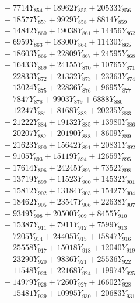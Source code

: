 \documentclass[a4paper,10pt]{article}
\begin{document}
{\begin{align}
&\;  + 7714 Y_{854} + 18962 Y_{855} + 20533 Y_{856} \\[0.3ex]
&\;  + 18577 Y_{857} + 9929 Y_{858} + 8814 Y_{859} \\[0.3ex]
&\;  + 14842 Y_{860} + 19038 Y_{861} + 14456 Y_{862} \\[0.3ex]
&\;  + 6959 Y_{863} + 18300 Y_{864} + 11430 Y_{865} \\[0.3ex]
&\;  + 18603 Y_{866} + 22809 Y_{867} + 24595 Y_{868} \\[0.5ex]\allowbreak
&\;  + 16433 Y_{869} + 24155 Y_{870} + 10765 Y_{871} \\[0.3ex]
&\;  + 22833 Y_{872} + 21332 Y_{873} + 23363 Y_{874} \\[0.3ex]
&\;  + 13024 Y_{875} + 22836 Y_{876} + 9695 Y_{877} \\[0.3ex]
&\;  + 7847 Y_{878} + 9903 Y_{879} + 6888 Y_{880} \\[0.3ex]
&\;  + 12247 Y_{881} + 8168 Y_{882} + 20235 Y_{883} \\[0.3ex]
&\;  + 21222 Y_{884} + 19132 Y_{885} + 13980 Y_{886} \\[0.3ex]
&\;  + 20207 Y_{887} + 20190 Y_{888} + 8609 Y_{889} \\[0.3ex]
&\;  + 21623 Y_{890} + 15642 Y_{891} + 20831 Y_{892} \\[0.3ex]
&\;  + 9105 Y_{893} + 15119 Y_{894} + 12659 Y_{895} \\[0.3ex]
&\;  + 17614 Y_{896} + 24245 Y_{897} + 7352 Y_{898} \\[0.5ex]\allowbreak
&\;  + 13719 Y_{899} + 11523 Y_{900} + 14532 Y_{901} \\[0.3ex]
&\;  + 15812 Y_{902} + 13184 Y_{903} + 15427 Y_{904} \\[0.3ex]
&\;  + 18462 Y_{905} + 23547 Y_{906} + 22638 Y_{907} \\[0.3ex]
&\;  + 9349 Y_{908} + 20500 Y_{909} + 8455 Y_{910} \\[0.3ex]
&\;  + 15387 Y_{911} + 7911 Y_{912} + 7599 Y_{913} \\[0.3ex]
&\;  + 7205 Y_{914} + 24405 Y_{915} + 15847 Y_{916} \\[0.3ex]
&\;  + 25558 Y_{917} + 15018 Y_{918} + 12040 Y_{919} \\[0.3ex]
&\;  + 23290 Y_{920} + 9836 Y_{921} + 25536 Y_{922} \\[0.3ex]
&\;  + 11548 Y_{923} + 22168 Y_{924} + 19974 Y_{925} \\[0.3ex]
&\;  + 14979 Y_{926} + 7260 Y_{927} + 16602 Y_{928} \\[0.5ex]\allowbreak
&\;  + 15481 Y_{929} + 10995 Y_{930} + 20683 Y_{931} \\[0.3ex]

\end{align}}
\end{document}
